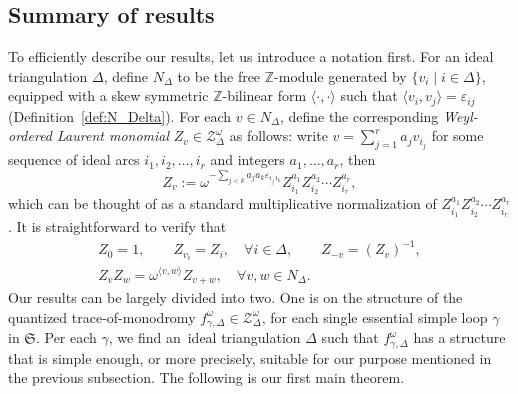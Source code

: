 \documentclass[10pt,a4paper]{amsart}
\numberwithin{equation}{section}
\theoremstyle{definition}
\begin{document}
\subsection{Summary of results}
To efficiently describe our results, let us introduce a notation first. For an ideal triangulation $\Delta$, define $N_\Delta$ to be the free $\mathbb{Z}$-module generated by $\{ v_i \mid i \in \Delta\}$, equipped with a skew symmetric $\mathbb{Z}$-bilinear form $\langle \cdot, \cdot \rangle$ such that $\langle v_i, v_j\rangle = \varepsilon_{ij}$ (Definition~\ref{def:N_Delta}). For each $v \in N_\Delta$, define the corresponding {\em Weyl-ordered Laurent monomial} $Z_v \in \mathcal{Z}^\omega_\Delta$ as follows: write $v = \sum_{j=1}^r a_j v_{i_j}$ for some sequence of ideal arcs $i_1,i_2,\dots,i_r$ and integers $a_1,\dots,a_r$, then
\[
Z_v := \omega^{- \sum_{j<k} a_j a_k \varepsilon_{i_j \, i_k} } Z_{i_1}^{a_1} Z_{i_2}^{a_2} \cdots Z_{i_r}^{a_r},
\]
which can be thought of as a standard multiplicative normalization of $Z_{i_1}^{a_1} Z_{i_2}^{a_2} \cdots Z_{i_r}^{a_r}$. It is straightforward to verify that
\begin{gather*}
Z_0 = 1, \qquad
Z_{v_i} = Z_i, \quad \forall i \in \Delta, \qquad
Z_{-v} = (Z_v)^{-1}, \\
Z_v Z_w = \omega^{\langle v,w\rangle} Z_{v+w}, \quad \forall v,w\in N_\Delta.
\end{gather*}
Our results can be largely divided into two. One is on the structure of the quantized trace-of-monodromy $f^\omega_{\gamma,\Delta} \in \mathcal{Z}^\omega_\Delta$, for each single essential simple loop $\gamma$ in $\mathfrak{S}$. Per each $\gamma$, we find an~ideal triangulation $\Delta$ such that $f^\omega_{\gamma,\Delta}$ has a structure that is simple enough, or more precisely, suitable for our purpose mentioned in the previous subsection. The following is our first main theorem.
\end{document}
